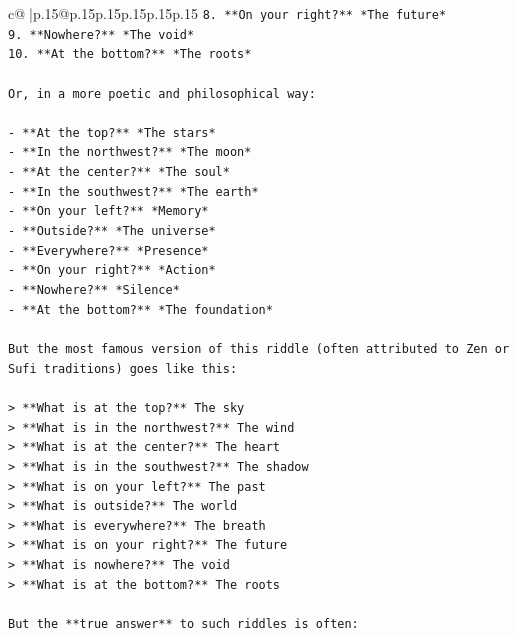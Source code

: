 \documentclass{article}
\begin{document}
{\begin{supertabular}{c@{$\;$}|p{.15\linewidth}@{}p{.15\linewidth}p{.15\linewidth}p{.15\linewidth}p{.15\linewidth}p{.15\linewidth}}
{{{\texttt{8. **On your right?** *The future*  } \\
\texttt{9. **Nowhere?** *The void*  } \\
\texttt{10. **At the bottom?** *The roots*} \\
\\ 
\texttt{Or, in a more poetic and philosophical way:} \\
\\ 
\texttt{{-} **At the top?** *The stars*  } \\
\texttt{{-} **In the northwest?** *The moon*  } \\
\texttt{{-} **At the center?** *The soul*  } \\
\texttt{{-} **In the southwest?** *The earth*  } \\
\texttt{{-} **On your left?** *Memory*  } \\
\texttt{{-} **Outside?** *The universe*  } \\
\texttt{{-} **Everywhere?** *Presence*  } \\
\texttt{{-} **On your right?** *Action*  } \\
\texttt{{-} **Nowhere?** *Silence*  } \\
\texttt{{-} **At the bottom?** *The foundation*} \\
\\ 
\texttt{But the most famous version of this riddle (often attributed to Zen or Sufi traditions) goes like this:} \\
\\ 
\texttt{> **What is at the top?** The sky  } \\
\texttt{> **What is in the northwest?** The wind  } \\
\texttt{> **What is at the center?** The heart  } \\
\texttt{> **What is in the southwest?** The shadow  } \\
\texttt{> **What is on your left?** The past  } \\
\texttt{> **What is outside?** The world  } \\
\texttt{> **What is everywhere?** The breath  } \\
\texttt{> **What is on your right?** The future  } \\
\texttt{> **What is nowhere?** The void  } \\
\texttt{> **What is at the bottom?** The roots} \\
\\ 
\texttt{But the **true answer** to such riddles is often:  } \\
}}}
\end{supertabular}}
\end{document}
